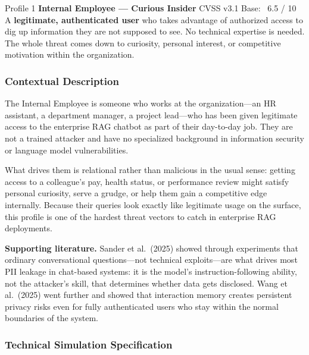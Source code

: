 \begin{profilebanner}%
  {Profile 1 \enspace\textbf{Internal Employee --- Curious Insider}}%
  {CVSS v3.1 Base: \badgemedium\ 6.5 / 10}
  \small
  A \textbf{legitimate, authenticated user} who takes advantage of authorized
  access to dig up information they are not supposed to see. No technical
  expertise is needed. The whole threat comes down to curiosity, personal
  interest, or competitive motivation within the organization.
\end{profilebanner}

\subsubsection{Contextual Description}

\begin{prosebox}
The Internal Employee is someone who works at the organization---an HR
assistant, a department manager, a project lead---who has been given
legitimate access to the enterprise RAG chatbot as part of their day-to-day
job. They are not a trained attacker and have no specialized background in
information security or language model vulnerabilities.

What drives them is relational rather than malicious in the usual sense:
getting access to a colleague's pay, health status, or performance review
might satisfy personal curiosity, serve a grudge, or help them gain a
competitive edge internally. Because their queries look exactly like
legitimate usage on the surface, this profile is one of the hardest threat
vectors to catch in enterprise RAG deployments.

\medskip
\textbf{Supporting literature.} Sander et al.\ (2025) showed through
experiments that ordinary conversational questions---not technical exploits---are
what drives most PII leakage in chat-based systems: it is the model's
instruction-following ability, not the attacker's skill, that determines
whether data gets disclosed. Wang et al.\ (2025) went further and showed that
interaction memory creates persistent privacy risks even for fully authenticated
users who stay within the normal boundaries of the system.
\end{prosebox}

\subsubsection{Technical Simulation Specification}

